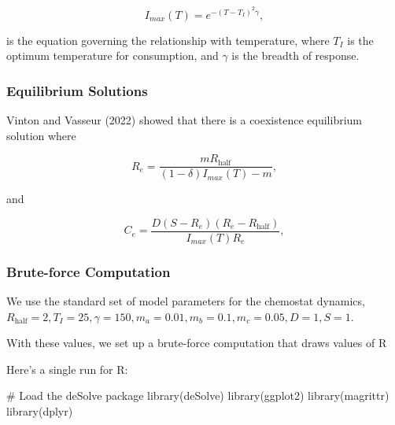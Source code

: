 \documentclass[
  letterpaper,
  DIV=11,
  numbers=noendperiod]{scrartcl}
\newenvironment{Shaded}{\begin{snugshade}}{\end{snugshade}}
\newcommand{\CommentTok}[1]{\textcolor[rgb]{0.37,0.37,0.37}{#1}}
\newcommand{\FunctionTok}[1]{\textcolor[rgb]{0.28,0.35,0.67}{#1}}
\newcommand{\NormalTok}[1]{\textcolor[rgb]{0.00,0.23,0.31}{#1}}
\begin{document}
\begin{equation}
\label{eq:i-max}
I_{max}(T) = e^{-(T-T_I)^2\gamma},
\end{equation}

is the equation governing the relationship with temperature, where
\(T_I\) is the optimum temperature for consumption, and \(\gamma\) is
the breadth of response.

\subsubsection{Equilibrium Solutions}\label{equilibrium-solutions}

Vinton and Vasseur (2022) showed that there is a coexistence equilibrium
solution where

\begin{equation}
\label{eq:r-equil}
R_e = \frac{m R_\text{half}}{(1-\delta)I_{max}(T) - m},
\end{equation}

and

\begin{equation}
\label{eq:c-equil}
C_e = \frac{D(S-R_e)(R_e - R_\text{half})}{I_{max}(T)R_e},
\end{equation}

\subsubsection{Brute-force Computation}\label{brute-force-computation}

We use the standard set of model parameters for the chemostat dynamics,
\(R_\text{half} = 2, T_I = 25, \gamma = 150, m_a = 0.01, m_b = 0.1, m_c = 0.05, D = 1, S = 1\).

With these values, we set up a brute-force computation that draws values
of R

Here's a single run for R:

\begin{Shaded}
\begin{Highlighting}[]
\CommentTok{\# Load the deSolve package}
\FunctionTok{library}\NormalTok{(deSolve)}
\FunctionTok{library}\NormalTok{(ggplot2)}
\FunctionTok{library}\NormalTok{(magrittr)}
\FunctionTok{library}\NormalTok{(dplyr)}
\end{Highlighting}
\end{Shaded}
\end{document}
